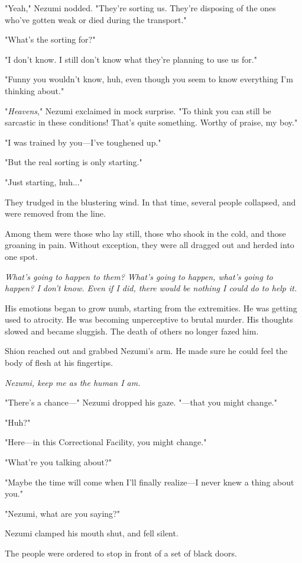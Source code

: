 "Yeah," Nezumi nodded. "They're sorting us. They're disposing of the
ones who've gotten weak or died during the transport."

"What's the sorting for?"

"I don't know. I still don't know what they're planning to use us for."

"Funny you wouldn't know, huh, even though you seem to know everything
I'm thinking about."

"\emph{Heavens}," Nezumi exclaimed in mock surprise. "To think you can
still be sarcastic in these conditions! That's quite something. Worthy
of praise, my boy."

"I was trained by you---I've toughened up."

"But the real sorting is only starting."

"Just starting, huh..."

They trudged in the blustering wind. In that time, several people
collapsed, and were removed from the line.

Among them were those who lay still, those who shook in the cold, and
those groaning in pain. Without exception, they were all dragged out and
herded into one spot.

\emph{What's going to happen to them? What's going to happen, what's
going to happen? I don't know. Even if I did, there would be nothing I
could do to help it.}

His emotions began to grow numb, starting from the extremities. He was
getting used to atrocity. He was becoming unperceptive to brutal murder.
His thoughts slowed and became sluggish. The death of others no longer
fazed him.

Shion reached out and grabbed Nezumi's arm. He made sure he could feel
the body of flesh at his fingertips.

\emph{Nezumi, keep me as the human I am.}

"There's a chance---" Nezumi dropped his gaze. "---that you might change."

"Huh?"

"Here---in this Correctional Facility, you might change."

"What're you talking about?"

"Maybe the time will come when I'll finally realize---I never knew a thing
about you."

"Nezumi, what are you saying?"

Nezumi clamped his mouth shut, and fell silent.

The people were ordered to stop in front of a set of black doors.

